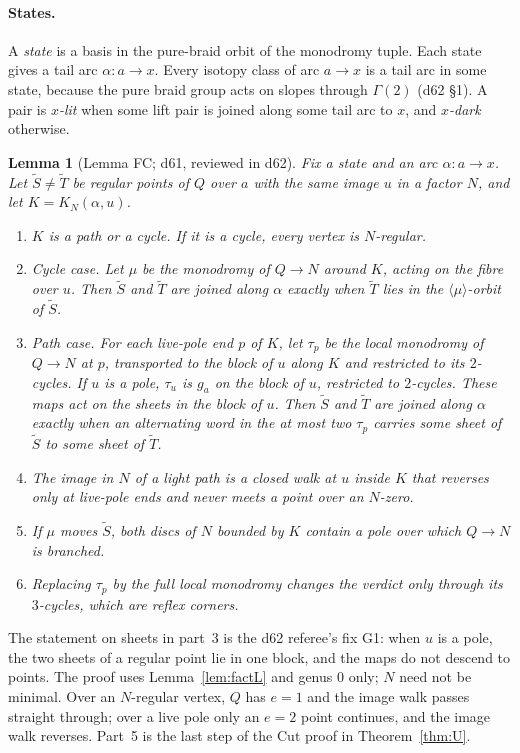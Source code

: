 \documentclass[11pt]{article}
\newtheorem{lemma}{Lemma}
\theoremstyle{definition}
\theoremstyle{remark}
\newcommand{\Cut}{\mathrm{Cut}}
\begin{document}
\paragraph{States.}
A \emph{state} is a basis in the pure-braid orbit of the monodromy tuple. Each
state gives a tail arc $\alpha\colon a\to x$. Every isotopy class of arc
$a\to x$ is a tail arc in some state, because the pure braid group acts on
slopes through $\Gamma(2)$ (d62 \S1). A pair is \emph{$x$-lit} when some lift
pair is joined along some tail arc to $x$, and \emph{$x$-dark} otherwise.

\begin{lemma}[Lemma FC; d61, reviewed in d62]\label{lem:FC}
Fix a state and an arc $\alpha\colon a\to x$. Let $\tilde S\ne\tilde T$ be regular
points of $Q$ over $a$ with the same image $u$ in a factor $N$, and let
$K=K_N(\alpha,u)$.
\begin{enumerate}
\item $K$ is a path or a cycle. If it is a cycle, every vertex is
$N$-regular.
\item \emph{Cycle case.} Let $\mu$ be the monodromy of $Q\to N$ around $K$,
acting on the fibre over $u$. Then $\tilde S$ and $\tilde T$ are joined along
$\alpha$ exactly when $\tilde T$ lies in the $\langle\mu\rangle$-orbit of $\tilde S$.
\item \emph{Path case.} For each live-pole end $p$ of $K$, let $\tau_p$ be the
local monodromy of $Q\to N$ at $p$, transported to the block of $u$ along $K$
and restricted to its $2$-cycles. If $u$ is a pole, $\tau_u$ is $g_a$ on the
block of $u$, restricted to $2$-cycles. These maps act on the sheets in the
block of $u$. Then $\tilde S$ and $\tilde T$ are joined along $\alpha$ exactly when
an alternating word in the at most two $\tau_p$ carries some sheet of $\tilde S$
to some sheet of $\tilde T$.
\item The image in $N$ of a light path is a closed walk at $u$ inside $K$ that
reverses only at live-pole ends and never meets a point over an $N$-zero.
\item If $\mu$ moves $\tilde S$, both discs of $N$ bounded by $K$ contain a pole
over which $Q\to N$ is branched.
\item Replacing $\tau_p$ by the full local monodromy changes the verdict only
through its $3$-cycles, which are reflex corners.
\end{enumerate}
\end{lemma}

The statement on sheets in part~3 is the d62 referee's fix G1: when $u$ is a
pole, the two sheets of a regular point lie in one block, and the maps do not
descend to points. The proof uses Lemma~\ref{lem:factL} and genus $0$ only; $N$
need not be minimal. Over an $N$-regular vertex, $Q$ has $e=1$ and the image
walk passes straight through; over a live pole only an $e=2$ point continues,
and the image walk reverses. Part~5 is the last step of the $\Cut$ proof in
Theorem~\ref{thm:U}.
\end{document}
